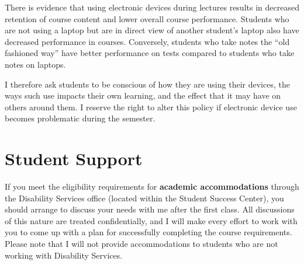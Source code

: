 \documentclass{tufte-book}
\begin{document}
\par There is evidence that using electronic devices during lectures results in decreased retention of course content  and lower overall course performance.  Students who are not using a laptop but are in direct view of another student's laptop also have decreased performance in courses. Conversely, students who take notes the ``old fashioned way'' have better performance on tests compared to students who take notes on laptops. 

\par I therefore ask students to be conscious of how they are using their devices, the ways such use impacts their own learning, and the effect that it may have on others around them. I reserve the right to alter this policy if electronic device use becomes problematic during the semester.

\vspace{3mm}
\section{Student Support}
If you meet the eligibility requirements for \textbf{academic accommodations} through the Disability Services office (located within the Student Success Center), you should arrange to discuss your needs with me after the first class. All discussions of this nature are treated confidentially, and I will make every effort to work with you to come up with a plan for successfully completing the course requirements. Please note that I will not provide accommodations to students who are not working with Disability Services.
\end{document}
